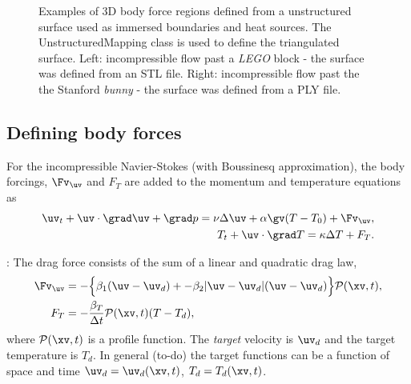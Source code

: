 \begin{figure}[hbt]
\newcommand{\figWidth}{7.0cm}
\newcommand{\trimfiga}[2]{\trimFigb{#1}{#2}{0.0}{.0}{.0}{.0}}
\newcommand{\figWidthb}{7.0cm}
\newcommand{\trimfigb}[2]{\trimFigb{#1}{#2}{0.1}{.25}{.15}{.2}}
\begin{center}
\end{center}
\caption{Examples of 3D body force regions defined from a unstructured surface used as immersed boundaries and heat sources.
 The UnstructuredMapping class is
used to define the triangulated surface. Left: incompressible flow past a {\em LEGO} block - the surface was defined
from an STL file. Right: incompressible flow past the the Stanford {\em bunny} - the surface was defined from a PLY file.}
\label{fig:bodyForceRegions}
\end{figure}


\subsection{Defining body forces} \label{sec:bodyForces}

For the incompressible Navier-Stokes (with Boussinesq approximation), the body forcings, $\Fv_{\uv}$ and $F_T$ are
added to the momentum and temperature equations as 
\begin{align}
  \uv_t + \uv\cdot\grad\uv + \grad p = \nu \Delta \uv + \alpha \gv (T-T_0)  + \Fv_{\uv}, \\
  T_t + \uv\cdot\grad T  = \kappa \Delta T  + F_T. 
\end{align}


: The drag force consists of the sum of a linear and quadratic drag law, 
\begin{align}
  \Fv_{\uv} & =  - \Big\{ \beta_1 ( \uv- \uv_d )  +-\beta_2 |\uv- \uv_d| ( \uv - \uv_d ) \Big\} \Pc(\xv,t), \\
   F_T       & = - \frac{\beta_T}{\dt}\Pc(\xv,t)( T - T_d ), 
\end{align}
where $\Pc(\xv,t)$ is a profile function. The {\em target} velocity is $\uv_d$ and the target temperature is $T_d$. 
In general (to-do) the target functions can be a function of space and time $\uv_d=\uv_d(\xv,t)$, $T_d=T_d(\xv,t)$.

